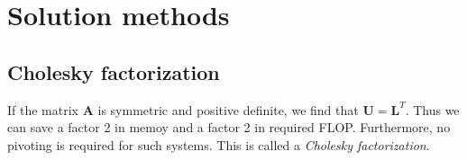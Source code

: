
\section{Solution methods} %
\label{sec:solution_methods}

\subsection{Cholesky factorization} %
\label{sub:banded_cholesky}

If the matrix $\mathbf{A}$ is symmetric and positive definite, we find that $\mathbf{U}=\mathbf{L}^T$. Thus we can save a factor 2 in memoy and a factor 2 in required FLOP. Furthermore, no pivoting is required for such systems. This is called a \emph{Cholesky factorization}.


